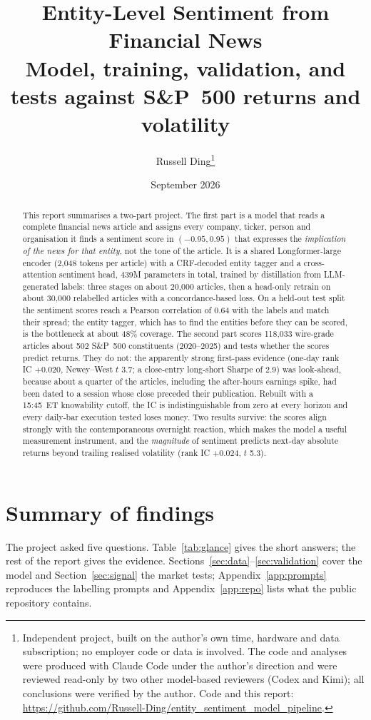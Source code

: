 \documentclass[11pt,letterpaper]{article}
\title{\textbf{Entity-Level Sentiment from Financial News}\\[4pt]
  \large Model, training, validation, and tests against S\&P~500 returns and volatility}
\author{Russell Ding\thanks{Independent project, built on the author's own time, hardware and data
  subscription; no employer code or data is involved. The code and analyses were produced with
  Claude Code under the author's direction and were reviewed read-only by two other model-based
  reviewers (Codex and Kimi); all conclusions were verified by the author. Code and this report:
  \url{https://github.com/Russell-Ding/entity_sentiment_model_pipeline}.}}
\date{September 2026}
\begin{document}
\maketitle

\begin{abstract}
\noindent
This report summarises a two-part project. The first part is a model that reads a complete
financial news article and assigns every company, ticker, person and organisation it finds a
sentiment score in $(-0.95, 0.95)$ that expresses the \emph{implication of the news for that
entity}, not the tone of the article. It is a shared Longformer-large encoder (2{,}048 tokens per
article) with a CRF-decoded entity tagger and a cross-attention sentiment head, 439M parameters in
total, trained by distillation from LLM-generated labels: three stages on about 20{,}000
articles, then a head-only retrain on about 30{,}000 relabelled articles with a
concordance-based loss. On a held-out test split the
sentiment scores reach a Pearson correlation of 0.64 with the labels and match their spread; the
entity tagger, which has to find the entities before they can be scored, is the bottleneck at
about 48\% coverage. The second part scores 118{,}033 wire-grade articles about 502 S\&P~500
constituents (2020--2025) and tests whether the scores predict returns. They do not: the
apparently strong first-pass evidence (one-day rank IC $+0.020$, Newey--West $t$ 3.7; a
close-entry long-short Sharpe of 2.9) was look-ahead, because about a quarter of the articles,
including the after-hours earnings spike, had been dated to a session whose close preceded their
publication. Rebuilt with a 15:45~ET knowability cutoff, the IC is indistinguishable from zero
at every horizon and every daily-bar execution tested loses money. Two results survive: the
scores align strongly with the contemporaneous overnight reaction, which makes the model a
useful measurement instrument, and the \emph{magnitude} of sentiment predicts next-day absolute
returns beyond trailing realised volatility (rank IC $+0.024$, $t$ 5.3).
\end{abstract}

\tableofcontents

\section{Summary of findings}
\label{sec:summary}

The project asked five questions. Table~\ref{tab:glance} gives the short answers; the rest of the
report gives the evidence. Sections~\ref{sec:data}--\ref{sec:validation} cover the model and
Section~\ref{sec:signal} the market tests; Appendix~\ref{app:prompts} reproduces the labelling
prompts and Appendix~\ref{app:repo} lists what the public repository contains.
\end{document}
